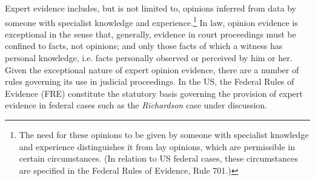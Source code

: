 \documentclass[output=paper,colorlinks,citecolor=brown]{langscibook}
\begin{document}
Expert evidence includes, but is not limited to, opinions inferred from data by someone with specialist knowledge and experience.\footnote{The need for these opinions to be given by someone with specialist knowledge and experience distinguishes it from lay opinions, which are permissible in certain circumstances. (In relation to US federal cases, these circumstances are specified in the Federal Rules of Evidence, Rule 701.)} In law, opinion evidence is exceptional in the sense that, generally, evidence in court proceedings must be confined to facts, not opinions; and only those facts of which a witness has personal knowledge, i.e. facts personally observed or perceived by him or her. Given the exceptional nature of expert opinion evidence, there are a number of rules governing its use in judicial proceedings.  In the US, the Federal Rules of Evidence (FRE) constitute the statutory basis governing the provision of expert evidence in federal cases such as the \emph{Richardson} case under discussion.
\end{document}
